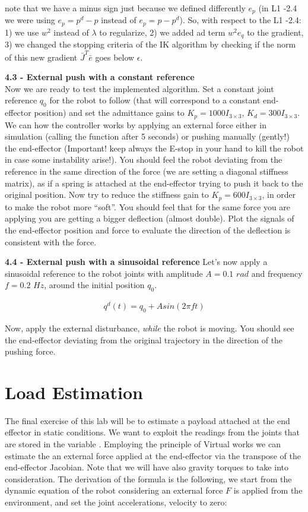 \documentclass[11pt]{article}
\begin{document}
note that we have a minus sign just because we defined differently $e_p$ (in L1 -2.4 we were using $e_p = p^d- p$ instead of $e_p = p - p^d$). So, with respect to the L1 -2.4: 1) we use $w^2$ instead of $\lambda $ to regularize, 2) we added ad term $w^2 e_q $ to the gradient, 3) we changed the stopping criteria of the IK algorithm by checking if the norm of this new gradient $\bar{J}^T\bar{e}$ goes below $\epsilon$.


\quad

\noindent
\textbf{4.3 - External push with a constant reference}\\
Now we are ready to test the implemented algorithm. Set  a constant joint reference $q_0$  for the robot to follow (that will correspond to a constant end-effector position) and set the admittance gains to $K_p = 1000I_{3\times3}$,  $K_d = 300I_{3\times3}$. We can how the controller works by applying an external force either in simulation (calling the function  after 5 seconds) or pushing manually (gently!) the end-effector (Important! keep always the E-stop in your hand to kill the robot in case some instability arise!). You should feel the robot deviating from the reference in the same direction of the force (we are setting a diagonal stiffness matrix), as if a spring is attached at the end-effector trying to push it back to the original position. 
Now try to reduce the stiffness gain to $K_p = 600I_{3\times3}$, in order to make the robot more ``soft''. You should feel that for the same force you are applying you are getting a bigger deflection (almost double).
Plot the signals of the end-effector position and force to evaluate the direction of the deflection is consistent with the force.

\textbf{4.4 - External push with a sinusoidal reference}
Let's now apply a sinusoidal reference to the robot joints  with amplitude $A= 0.1$ $rad$ and frequency $f = 0.2$ $Hz$, around the initial position $q_0$.

\begin{align*}
q^d(t) = q_0 + Asin(2\pi f t )
\end{align*} 

Now, apply the external disturbance, \textit{while} the robot is moving. You should see the end-effector deviating from the original trajectory in the direction of the pushing force. 
 



\section{Load Estimation}
The final exercise of this lab will be to estimate a payload attached at the end effector in static conditions. We want to exploit the readings from the  joints that are stored in the variable . Employing the principle of Virtual works we can estimate the an external force applied at the end-effector via the transpose of the end-effector Jacobian. Note that we will have also gravity torques to take into consideration.
The derivation of the formula is the following, we start from the dynamic equation of the robot considering an external force $F$ is applied from the environment, and set the joint accelerations, velocity to zero:
\end{document}
